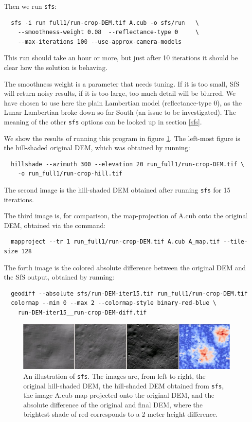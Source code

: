 Then we run \texttt{sfs}:
\begin{verbatim}
  sfs -i run_full1/run-crop-DEM.tif A.cub -o sfs/run   \
    --smoothness-weight 0.08  --reflectance-type 0     \
    --max-iterations 100 --use-approx-camera-models
\end{verbatim}
This run should take an hour or more, but just after 10 iterations
it should be clear how the solution is behaving.

The smoothness weight is a parameter that needs tuning. If it is too
small, SfS will return noisy results, if it is too large, too much
detail will be blurred. We have chosen to use here the plain Lambertian
model (reflectance-type 0), as the Lunar Lambertian broke down so far
South (an issue to be investigated). The meaning of the other
\texttt{sfs} options can be looked up in section \ref{sfs}.

We show the results of running this program in figure
\ref{fig:sfs1}. The left-most figure is the hill-shaded original DEM,
which was obtained by running:
\begin{verbatim}
  hillshade --azimuth 300 --elevation 20 run_full1/run-crop-DEM.tif \
    -o run_full1/run-crop-hill.tif 
\end{verbatim}
The second image is the hill-shaded DEM obtained after running
\texttt{sfs} for 15 iterations.

The third image is, for comparison, the map-projection of A.cub onto the
original DEM, obtained via the command:
\begin{verbatim}
  mapproject --tr 1 run_full1/run-crop-DEM.tif A.cub A_map.tif --tile-size 128
\end{verbatim}
The forth image is the colored absolute difference between the original
DEM and the SfS output, obtained by running:
\begin{verbatim}
  geodiff --absolute sfs/run-DEM-iter15.tif run_full1/run-crop-DEM.tif
  colormap --min 0 --max 2 --colormap-style binary-red-blue \
    run-DEM-iter15__run-crop-DEM-diff.tif
\end{verbatim}
\begin{figure}[h!]
\begin{center}
\includegraphics[width=7in]{images/sfs1.jpg}
\caption[sfs]{An illustration of \texttt{sfs}. The images are, from
  left to right, the original hill-shaded DEM, the hill-shaded DEM obtained
from \texttt{sfs}, the image A.cub map-projected onto the original DEM,
and the absolute difference of the original and final DEM, where the brightest
shade of red corresponds to a 2 meter height difference.}
\label{fig:sfs1}
\end{center}
\end{figure}

